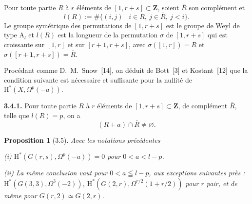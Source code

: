 \documentclass[12pt,a4paper]{article}
\theoremstyle{plain}
\newtheorem{proposition}[theorem]{Proposition}
\theoremstyle{definition}
\begin{document}
Pour toute partie $R$ à $r$ éléments de $[1, r+s] \subset \mathbf{Z}$, soient $\bar{R}$ son complément et
\[
l(R) := \# \{(i,j) \mid i \in R,\ j \in \bar{R},\ j < i\}.
\]
Le groupe symétrique des permutations de $[1, r+s]$ est le groupe de Weyl de type $\mathrm{A}_l$ et $l(R)$ est la longueur de la permutation $\sigma$ de $[1, r+s]$ qui est croissante sur $[1, r]$ et sur $[r+1, r+s]$, avec $\sigma([1, r]) = R$ et $\sigma([r+1, r+s]) = \bar{R}$.

Procédant comme D.\ M.\ Snow~[14], on déduit de Bott~[3] et Kostant~[12] que la condition suivante est nécessaire et suffisante pour la nullité de $\mathrm{H}^*(X, \Omega^p(-a))$.

\medskip
\textbf{3.4.1.} Pour toute partie $R$ à $r$ éléments de $[1, r+s] \subset \mathbf{Z}$, de complément $\bar{R}$, telle que $l(R) = p$, on a
\[
(R+a) \cap \bar{R} \neq \varnothing.
\]

\begin{proposition}[3.5]
Avec les notations précédentes

\emph{(i)} $\mathrm{H}^*(G(r,s), \Omega^p(-a)) = 0$ pour $0 < a < l - p$.

\emph{(ii)} La même conclusion vaut pour $0 < a \leqq l - p$, aux exceptions suivantes près : $\mathrm{H}^*(G(3,3), \Omega^3(-2))$, $\mathrm{H}^*(G(2,r), \Omega^{r/2}(1+r/2))$ pour $r$ pair, et de même pour $G(r, 2) \simeq G(2, r)$.
\end{proposition}
\end{document}
